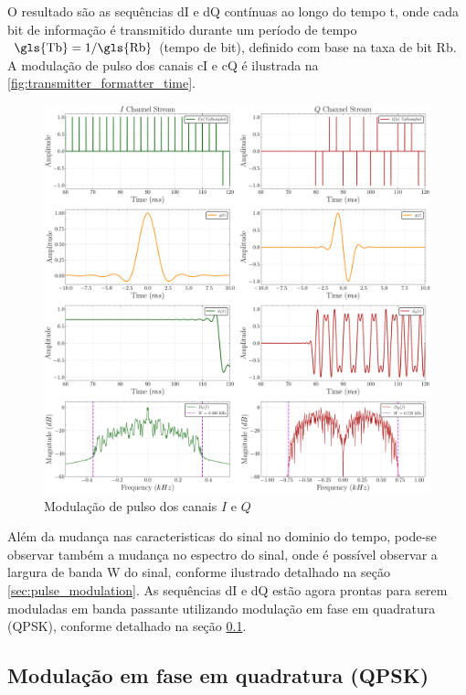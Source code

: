 O resultado são as sequências \gls{dI} e \gls{dQ} contínuas ao longo do tempo \gls{t}, onde cada bit de informação é transmitido durante um período de tempo $\text{ \gls{Tb}} = 1/ \text{\gls{Rb}}$ (tempo de bit), definido com base na taxa de bit \gls{Rb}. A modulação de pulso dos canais \gls{cI} e \gls{cQ} é ilustrada na \autoref{fig:transmitter_formatter_time}.

\begin{figure}[H]
	\centering
	\caption{Modulação de pulso dos canais $I$ e $Q$}\label{fig:transmitter_formatter_time}
	\includegraphics[width=\linewidth]{assets/cap3/transmitter_formatter_time_comp.pdf}
\end{figure}

Além da mudança nas caracteristicas do sinal no dominio do tempo, pode-se observar também a mudança no espectro do sinal, onde é possível observar a largura de banda \gls{W} do sinal, conforme ilustrado detalhado na seção \ref{sec:pulse_modulation}.  As sequências \gls{dI} e \gls{dQ} estão agora prontas para serem moduladas em banda passante utilizando modulação em fase em quadratura (\gls{QPSK}), conforme detalhado na seção \ref{sec:qpsk}. 

\subsection{Modulação em fase em quadratura (QPSK)}\label{sec:qpsk}

